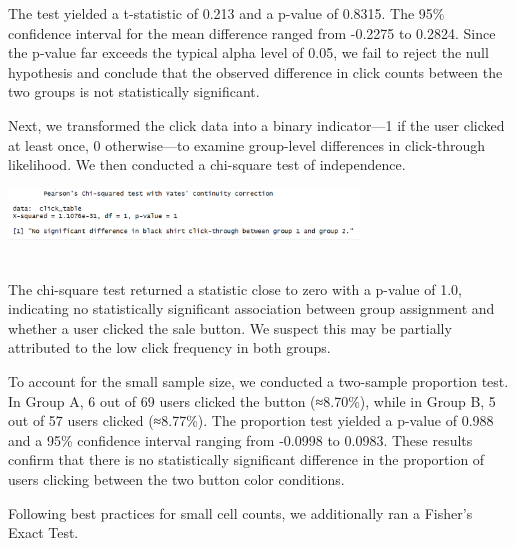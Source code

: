 \documentclass[
  letterpaper,
  DIV=11,
  numbers=noendperiod]{scrartcl}
\begin{document}
The test yielded a t-statistic of 0.213 and a p-value of 0.8315. The
95\% confidence interval for the mean difference ranged from -0.2275 to
0.2824. Since the p-value far exceeds the typical alpha level of 0.05,
we fail to reject the null hypothesis and conclude that the observed
difference in click counts between the two groups is not statistically
significant.

Next, we transformed the click data into a binary indicator---1 if the
user clicked at least once, 0 otherwise---to examine group-level
differences in click-through likelihood. We then conducted a chi-square
test of independence.

\begin{center}
\includegraphics[width=0.7\textwidth,height=\textheight]{data_ana_pj3_files/chi_square.png}
\end{center}
\\
The chi-square test returned a statistic close to zero with a p-value of
1.0, indicating no statistically significant association between group
assignment and whether a user clicked the sale button. We suspect this
may be partially attributed to the low click frequency in both groups.

To account for the small sample size, we conducted a two-sample
proportion test. In Group A, 6 out of 69 users clicked the button
(≈8.70\%), while in Group B, 5 out of 57 users clicked (≈8.77\%). The
proportion test yielded a p-value of 0.988 and a 95\% confidence
interval ranging from -0.0998 to 0.0983. These results confirm that
there is no statistically significant difference in the proportion of
users clicking between the two button color conditions.

Following best practices for small cell counts, we additionally ran a
Fisher's Exact Test.
\end{document}

